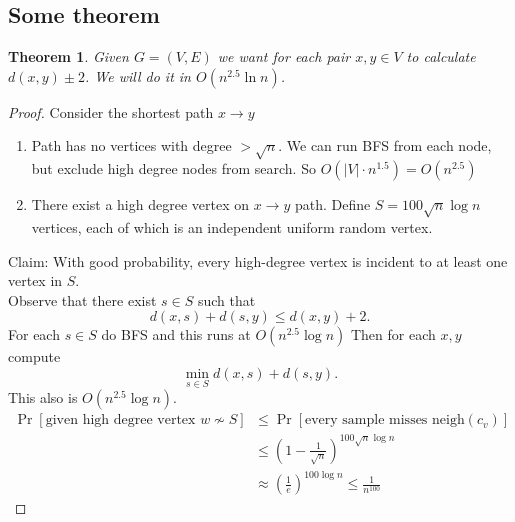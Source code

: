 \documentclass[a4paper]{article}
\newtheorem{thm}{Theorem}[section]
\begin{document}
\subsection{Some theorem}
\begin{thm}
    Given $G=(V,E)$ we want for each pair $x,y\in V$ to calculate $d(x,y)\pm 2$. We will do it in $O(n^{2.5}\ln n)$.
\end{thm}
\begin{proof}
    Consider the shortest path $x\to y$ 
    \begin{enumerate}
        \item[Option 1:] Path has no vertices with degree $>\sqrt{n}$. We can run BFS from each node, but exclude high degree nodes from search. So $O(|V|\cdot n^{1.5})=O(n^{2.5})$
        \item[Option 2:] There exist a high degree vertex on $x\to y$ path. Define $S=100\sqrt{n}\log n$ vertices, each of which is an independent uniform random vertex. 
    \end{enumerate}
    Claim: With good probability, every high-degree vertex is incident to at least one vertex in $S$. \\
    Observe that there exist $s\in S$ such that \[
    d(x,s)+d(s,y)\leq d(x,y)+2
    .\]
    For each $s\in S$ do BFS and this runs at $O(n^{2.5} \log n)$
    Then for each $x,y$ compute \[
    \min_{s\in S}d(x,s)+d(s,y)
    .\] 
    This also is $O(n^{2.5}\log n).$
    \begin{align*}
        \Pr[ \text{given high degree vertex } w\not \sim S]&\leq \Pr[ \text{every sample misses neigh}(c_v)]\\
        &\leq \left(  1-\frac{1}{\sqrt{n}} \right)^{100\sqrt{n}\log n}\\
        &\approx \left( \frac{1}{e} \right)^{100\log n}\leq \frac{1}{n^{100}}
    \end{align*} 
\end{proof}
\newpage
\end{document}
